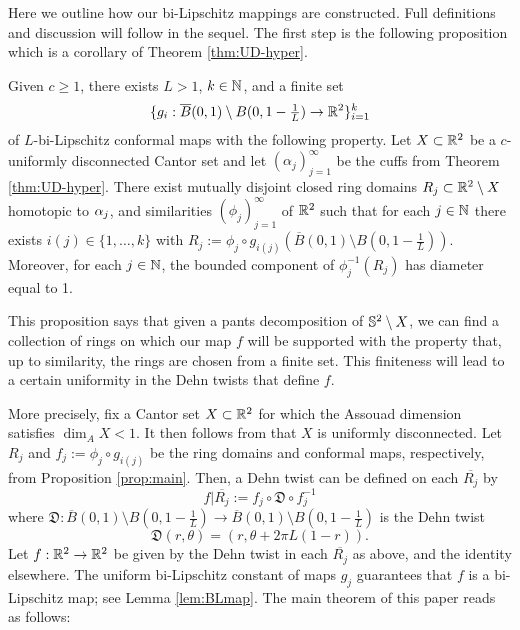 \documentclass{amsart}
\begin{document}
Here we outline how our bi-Lipschitz mappings are constructed. Full definitions and discussion will follow in the sequel. The first step is the following proposition which is a corollary of Theorem \ref{thm:UD-hyper}. 


\begin{proposition}\label{prop:main}
Given $c\geq 1$, there exists $L>1$, $k\in\N$, and a finite set 
\[ \{g_i : \overline{B}(0,1)\setminus B(0,1-\tfrac1{L}) \to \R^2\}_{i=1}^{k}\] 
of $L$-bi-Lipschitz conformal maps with the following property. Let $X\subset \R^2$ be a $c$-uniformly disconnected Cantor set and let $(\alpha_j)_{j=1}^{\infty}$ be the cuffs from Theorem \ref{thm:UD-hyper}. There exist mutually disjoint closed ring domains $R_j \subset \R^2 \setminus X$ homotopic to $\a_j$, and similarities $(\phi_j)_{j=1}^{\infty}$ of $\R^2$ such that for each $j\in\N$ there exists $i(j)\in \{1,\dots,k\}$ with $R_j := \phi_j\circ g_{i(j)} (\overline{B}(0,1)\setminus B(0,1-\frac1{L}))$.  Moreover, for each $j\in\N$, the bounded component of $\phi_j^{-1}(R_j)$ has diameter equal to 1.
\end{proposition}

This proposition says that given a pants decomposition of $\S^2 \setminus X$, we can find a collection of rings on which our map $f$ will be supported with the property that, up to similarity, the rings are chosen from a finite set. This finiteness will lead to a certain uniformity in the Dehn twists that define $f$.

More precisely, fix a Cantor set $X \subset \R^2$ for which the Assouad dimension satisfies $\dim _A X <1$. It then follows from \cite{Lu} that $X$ is uniformly disconnected. Let $R_j$ and $f_j:= \phi_j\circ g_{i(j)}$ be the ring domains and conformal maps, respectively, from Proposition \ref{prop:main}. Then, a Dehn twist can be defined on each $\overline{R_j}$ by
\[ f|\overline{R_j} := f_j\circ \mathfrak{D} \circ f_j^{-1}\]
where $\mathfrak{D}: \overline{B}(0,1)\setminus B(0,1-\frac1{L}) \to \overline{B}(0,1)\setminus  B(0,1-\frac1{L})$ is the Dehn twist
\[ \mathfrak{D}(r,\theta) = (r,\theta + 2\pi L(1-r)).\]
Let $f:\R^2 \to \R^2$ be given by the Dehn twist in each $\overline{R_j}$ as above, and the identity elsewhere. The uniform bi-Lipschitz constant of maps $g_j$ guarantees that $f$ is a bi-Lipschitz map; see Lemma \ref{lem:BLmap}. The main theorem of this paper reads as follows:
\end{document}
